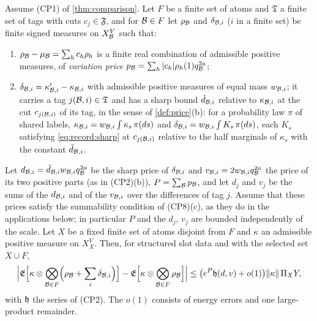 \begin{lemma}\label{lem:sharp-first}
Assume (CP1) of \cref{thm:comparison}. Let $F$ be a finite set of atoms and
$\mathfrak T$ a finite set of tags with cuts $c_j\in\mathfrak F$, and for
$\mathcal B\in F$ let $\rho_\mathcal B$ and $\delta_{\mathcal B,i}$ ($i$ in a finite set) be
finite signed measures on $X_\mathcal B^V$ such that:
\begin{enumerate}[label=(\alph*)]
\item $\rho_\mathcal B-\mu_\mathcal B=\sum_hc_h\rho_h$ is a finite real combination of
 admissible positive measures, of \emph{variation price}
 $p_\mathcal B=\sum_h|c_h|\rho_h(1)q_\mathcal B^{2a}$;
\item $\delta_{\mathcal B,i}=\kappa'_{\mathcal B,i}-\kappa_{\mathcal B,i}$ with admissible positive
 measures of equal mass $w_{\mathcal B,i}$; it carries a tag $j(\mathcal B,i)\in\mathfrak T$
 and has a sharp bound $\tilde d_{\mathcal B,i}$ relative to $\kappa_{\mathcal B,i}$ at the
 cut $c_{j(\mathcal B,i)}$ of its tag, in the sense of \cref{def:price}(b): for a
 probability law $\pi$ of shared labels,
 $\kappa_{\mathcal B,i}=w_{\mathcal B,i}\int\kappa_s\,\pi(ds)$ and
 $\delta_{\mathcal B,i}=w_{\mathcal B,i}\int K_s\,\pi(ds)$, each $K_s$ satisfying
 \eqref{eq:record:sharp} at $c_{j(\mathcal B,i)}$ relative to the half marginals of
 $\kappa_s$ with the constant $\tilde d_{\mathcal B,i}$.
\end{enumerate}
Let $d_{\mathcal B,i}=\tilde d_{\mathcal B,i}w_{\mathcal B,i}q_\mathcal B^{2a}$ be the sharp price of
$\delta_{\mathcal B,i}$ and $v_{\mathcal B,i}=2w_{\mathcal B,i}q_\mathcal B^{2a}$ the price of its two
positive parts (as in (CP2)(b)), $P=\sum_\mathcal B p_\mathcal B$, and let $d_j$ and $v_j$
be the sums of the $d_{\mathcal B,i}$ and of the $v_{\mathcal B,i}$ over the differences of
tag $j$. Assume that these prices satisfy the summability condition of
(CP8)(c), as they do in the applications below; in particular $P$ and the
$d_j$, $v_j$ are bounded independently of the scale. Let $X$ be a fixed finite set
of atoms disjoint from $F$ and $\kappa$ an admissible positive measure on
$X_X^V$. Then, for structured slot data and with the selected set $X\cup F$,
\[
 \Bigl|\mathfrak E\Bigl[\kappa\otimes\bigotimes_{\mathcal B\in F}
 \Bigl(\rho_\mathcal B+\sum_i\delta_{\mathcal B,i}\Bigr)\Bigr]
 -\mathfrak E\Bigl[\kappa\otimes\bigotimes_{\mathcal B\in F}\rho_\mathcal B\Bigr]\Bigr|
 \le\bigl(e^P\mathfrak h(d,v)+o(1)\bigr)\|\kappa\|\,\Pi_XY ,
\]
with $\mathfrak h$ the series of (CP2). The $o(1)$ consists of energy errors and
one large-product remainder.
\end{lemma}


